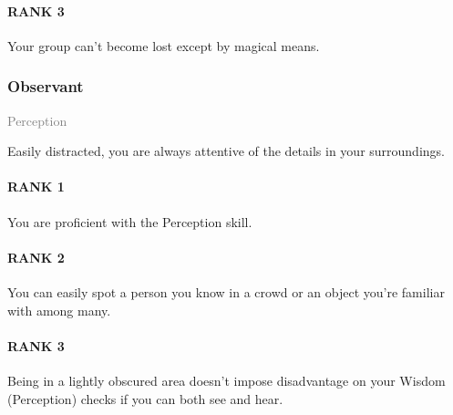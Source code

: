 \paragraph{RANK 3} Your group can't become lost except by magical means.

\subsubsection{Observant} \label{feat::observant}
\small{\textcolor{gray}{Perception}}

\normalsize
Easily distracted, you are always attentive of the details in your surroundings.
\paragraph{RANK 1} You are proficient with the Perception skill.
\paragraph{RANK 2} You can easily spot a person you know in a crowd or an object you're familiar with among many.
\paragraph{RANK 3} Being in a lightly obscured area doesn't impose disadvantage on your Wisdom (Perception) checks if you can both see and hear.

